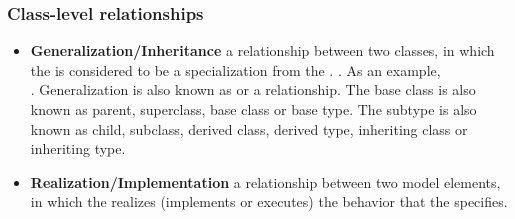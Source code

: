     \subsubsection{Class-level relationships}
    \begin{itemize}
        \item \textbf{Generalization/Inheritance}
              \newline
              a relationship between two classes, in which the  is 
              considered to be a specialization from the . 
              \newline
              . 
              As an example, \\
              .
              \newline
              Generalization is also known as  or a 
               relationship. 
              \newline
              The base class is also known as parent, superclass, 
              base class or base type.
              \newline
              The subtype is also known as child, subclass, 
              derived class, derived type, inheriting class or 
              inheriting type.
        \item \textbf{Realization/Implementation}
              \newline
              a relationship between two model elements, in which
              the  realizes (implements or executes) the behavior 
              that the  specifies.
    \end{itemize}
